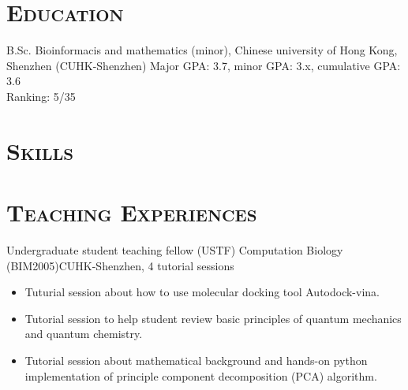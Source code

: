 \documentclass[11pt,a4paper]{moderncv}
\newcommand{\cvsection}[1]{\section{\textsc{#1}}}
\begin{document}
\maketitle

\cvsection{Education}
        {B.Sc.}
        {}
        {Bioinformacis and mathematics (minor), Chinese university of Hong Kong, Shenzhen (CUHK-Shenzhen)}
        {}
        {Major GPA: 3.7, minor GPA: 3.x, cumulative GPA: 3.6\\Ranking: 5/35}

\cvsection{Skills}

\cvsection{Teaching Experiences}
        {Undergraduate student teaching fellow (USTF)}{}
        {Computation Biology (BIM2005)}{CUHK-Shenzhen, 4 tutorial sessions}
        {
            \begin{itemize}
                \item Tuturial session about how to use molecular docking tool Autodock-vina.
                \item Tutorial session to help student review basic principles of quantum mechanics and quantum chemistry.
                \item Tutorial session about mathematical background and hands-on python implementation of principle component decomposition (PCA) algorithm.
            \end{itemize}
        }
\end{document}
